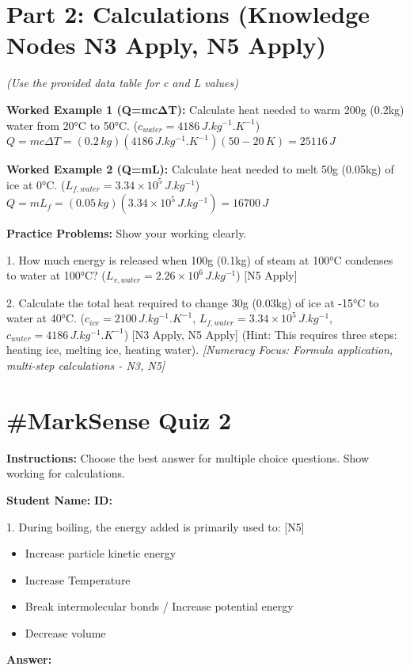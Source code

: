 \documentclass[11pt, a4paper]{article}
\begin{document}
\section*{Part 2: Calculations (Knowledge Nodes N3 Apply, N5 Apply)}
\textit{(Use the provided data table for c and L values)}

\textbf{Worked Example 1 (Q=mcΔT):} Calculate heat needed to warm 200g (0.2kg) water from 20\si{\celsius} to 50\si{\celsius}. ($c_{water} = 4186 \, \si{J.kg^{-1}.K^{-1}}$)
$Q = mc\Delta T = (0.2\,\si{kg})(4186\,\si{J.kg^{-1}.K^{-1}})(50-20\,\si{K}) = 25116\,\si{J}$

\textbf{Worked Example 2 (Q=mL):} Calculate heat needed to melt 50g (0.05kg) of ice at 0\si{\celsius}. ($L_{f, water} = 3.34 \times 10^5 \, \si{J.kg^{-1}}$)
$Q = mL_f = (0.05\,\si{kg})(3.34 \times 10^5\,\si{J.kg^{-1}}) = 16700\,\si{J}$

\textbf{Practice Problems:} Show your working clearly.

1.  How much energy is released when 100g (0.1kg) of steam at 100\si{\celsius} condenses to water at 100\si{\celsius}? ($L_{v, water} = 2.26 \times 10^6 \, \si{J.kg^{-1}}$) [N5 Apply]
    \vspace{3cm}

2.  Calculate the total heat required to change 30g (0.03kg) of ice at -15\si{\celsius} to water at 40\si{\celsius}. ($c_{ice} = 2100\,\si{J.kg^{-1}.K^{-1}}$, $L_{f, water} = 3.34 \times 10^5\,\si{J.kg^{-1}}$, $c_{water} = 4186\,\si{J.kg^{-1}.K^{-1}}$) [N3 Apply, N5 Apply]
    (Hint: This requires three steps: heating ice, melting ice, heating water).
    \vspace{5cm}
    \textit{[Numeracy Focus: Formula application, multi-step calculations - N3, N5]}


\hrulefill
\section*{\#MarkSense Quiz 2}
\textbf{Instructions:} Choose the best answer for multiple choice questions. Show working for calculations.

\vspace{0.5cm}
\textbf{Student Name:} \underline{\hspace{5cm}} \textbf{ID:} \underline{\hspace{3cm}}
\vspace{0.5cm}

1.  During boiling, the energy added is primarily used to: [N5]
    \begin{itemize}
        \item[A.] Increase particle kinetic energy
        \item[B.] Increase Temperature
        \item[C.] Break intermolecular bonds / Increase potential energy
        \item[D.] Decrease volume
    \end{itemize}
    \textbf{Answer:} \underline{\hspace{1cm}}
\end{document}
